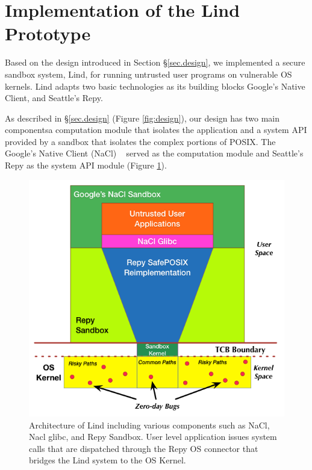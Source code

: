 \section{Implementation of the Lind Prototype}
\label{sec.implementation}

Based on the design introduced in Section \S{\ref{sec.design}}, 
we implemented a secure sandbox system, Lind, 
for running untrusted user programs on vulnerable OS kernels. 
Lind adapts two basic technologies as its building blocks\textendash 
Google's Native Client, and Seattle's Repy. 

As described in \S{\ref{sec.design}} (Figure \ref{fig:design}), our design has
two main components\textendash a computation module that isolates the 
application and a system API provided by a sandbox that isolates the complex 
portions of POSIX.
The Google's Native Client (NaCl) ~\cite{NaCl-09} served as the computation 
module 
and Seattle's Repy as the system API module (Figure \ref{fig:architecture}).

\begin{figure}%
\centering
\includegraphics[width=1.0\columnwidth]{diagram/lind_architecture_new.png}
\caption{Architecture of Lind including various components such as NaCl, Nacl glibc, and Repy Sandbox. User level application issues system calls that are dispatched through the Repy OS connector that bridges the Lind system to the OS Kernel.}

\label{fig:architecture}
\end{figure}

